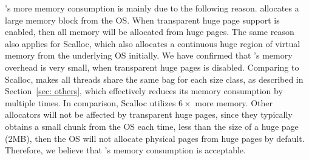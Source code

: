 \NM{}'s more memory consumption is mainly due to the following reason. \NM{} allocates a large memory block from the OS. When transparent huge page support is enabled, then all memory will be allocated from huge pages. The same reason also applies for Scalloc, which also allocates a continuous huge region of virtual memory from the underlying OS initially. We have confirmed that \NM{}'s memory overhead is very small, when transparent huge pages is disabled. Comparing to Scalloc, \NM{} makes all threads share the same bag for each size class, as described in Section~\ref{sec: others}, which effectively reduces its memory consumption by multiple times. In comparison, Scalloc utilizes $6\times$ more memory. Other allocators will not be affected by transparent huge pages, since they typically obtains a small chunk from the OS each time, less than the size of a huge page (2MB), then the OS will not allocate physical pages from huge pages by default.  
Therefore, we believe that \NM{}'s memory consumption is acceptable. 
 
 
